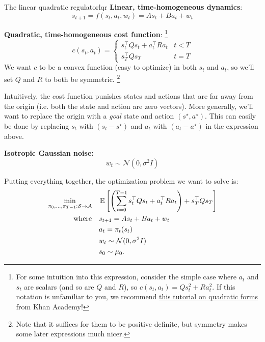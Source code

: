 \documentclass[../main/main]{subfiles}
\begin{document}
\begin{definition}{The linear quadratic regulator}{lqr}
    \textbf{Linear, time-homogeneous dynamics}: \[
        s_{t+1} = f(s_t, a_t, w_t) = A s_t + B a_t + w_t
    \]

    \noindent \textbf{Quadratic, time-homogeneous cost function}:
    \footnote{For some intuition into this expression, consider the simple case where $a_t$ and $s_t$ are scalars (and so are $Q$ and $R$), so $c(s_t, a_t) = Q s_t^2 + R a_t^2$. If this notation is unfamiliar to you, we recommend \href{https://www.khanacademy.org/math/multivariable-calculus/applications-of-multivariable-derivatives/quadratic-approximations/v/expressing-a-quadratic-form-with-a-matrix}{this tutorial on quadratic forms} from Khan Academy!}
    \[
        c(s_t, a_t) = \begin{cases}
            s_t^\top Q s_t + a_t^\top R a_t & t < T \\
            s_T^\top Q s_T & t = T
        \end{cases}
    \]
    We want $c$ to be a convex function (easy to optimize) in both $s_t$ and $a_t$, so we'll set $Q$ and $R$ to both be symmetric. \footnote{Note that it suffices for them to be positive definite, but symmetry makes some later expressions much nicer.}

    Intuitively, the cost function punishes states and actions that are far away from the origin (i.e. both the state and action are zero vectors). More generally, we'll want to replace the origin with a \emph{goal} state and action $(s^\star, a^\star).$ This can easily be done by replacing $s_t$ with $(s_t - s^\star)$ and $a_t$ with $(a_t - a^\star)$ in the expression above.
    

    \noindent \textbf{Isotropic Gaussian noise:} \[ w_t \sim \mathcal{N}(0, \sigma^2 I) \]

    \noindent Putting everything together, the optimization problem we want to solve is:
    \begin{align*}
        \min_{\pi_0, \dots, \pi_{T-1} : \mathcal{S} \to \mathcal{A}} \quad & \operatorname*{\mathbb{E}} \left[ \left( \sum_{t=0}^{T-1} s_t^\top Q s_t + a_t^\top R a_t \right) + s_T^\top Q s_T \right] \\
        \textrm{where} \quad & s_{t+1} = A s_t + B a_t + w_t \\
        & a_t = \pi_t (s_t) \\
        & w_t \sim \mathcal{N}(0, \sigma^2 I) \\
        & s_0 \sim \mu_0.
    \end{align*}
\end{definition}
\end{document}

